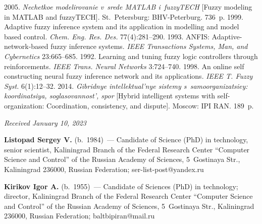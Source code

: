 \begin{multicols}{2}
{{\begin{thebibliography}{99}
\columnbreak

    2005. \textit{Nechetkoe modelirovanie v~srede MATLAB i~fuzzyTECH} 
[Fuzzy modeling in MATLAB and fuzzyTECH]. St.\ Petersburg: BHV-Peterburg. 736~p.
    1999. Adaptive fuzzy inference system and its application 
in modelling and model based control. \textit{Chem. Eng. Res. Des.} 77(4):281--290.
    1993. ANFIS: Adaptive-network-based fuzzy inference systems. \textit{IEEE 
Transactions Systems, Man, and Cybernetics} 23:665--685.
    1992. Learning and tuning fuzzy logic controllers through 
reinforcements. \textit{IEEE Trans. Neural Networks} 3:724--740.
    1998. An online self constructing neural fuzzy inference network 
and its applications. \textit{IEEE T. Fuzzy Syst.} 6(1):12--32.
    2014. \textit{Gibridnye intellektual'nye  
sis\-te\-my s~samoorganizatsiey: koordinatsiya, soglasovannost', spor} [Hybrid intelligent systems with  
self-organization: Coordination, consistency, and dispute]. Moscow: IPI RAN. 189~p.
\end{thebibliography}

 }
 }

\end{multicols}

\vspace*{-6pt}

\hfill{\footnotesize\textit{Received January 10, 2023}}   
   
   \Contr
   
   \noindent
   \textbf{Listopad Sergey V.} (b.\ 1984)~--- Candidate of Science (PhD) in technology, senior scientist, 
Kaliningrad Branch of the Federal Research Center ``Computer Science and Control'' of the Russian 
Academy of Sciences, 5~Gostinaya Str., Kaliningrad 236000, Russian Federation;  
\mbox{ser-list-post@yandex.ru}
   
   \vspace*{3pt}
   
   \noindent
   \textbf{Kirikov Igor A.} (b.\ 1955)~--- Candidate of  Sciences (PhD) in technology; director, 
Kaliningrad Branch of the Federal Research Center ``Computer Science and Control'' of the Russian 
Academy of Sciences, 5~Gostinaya Str., Kaliningrad 236000, Russian Federation; 
\mbox{baltbipiran@mail.ru}
   
 

   
\label{end\stat}

\renewcommand{\bibname}{\protect\rm Литература} 